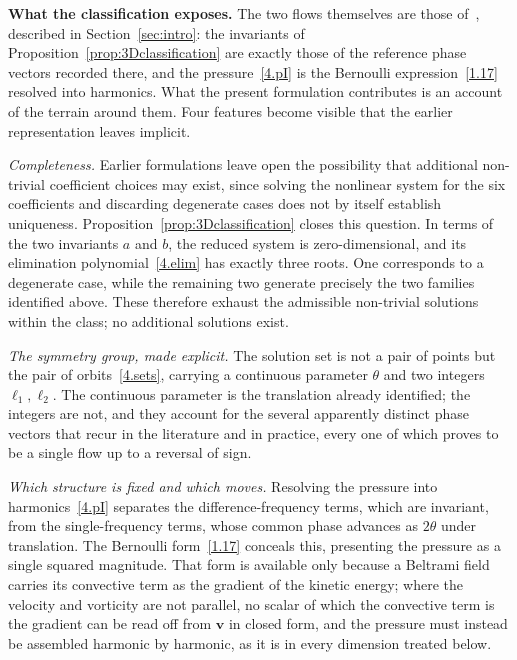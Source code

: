 \documentclass[11pt]{jfm}
\numberwithin{equation}{section}
\begin{document}
\medskip
\noindent\textbf{What the classification exposes.} The two flows themselves are those
of~\citet{ant}, described in Section~\ref{sec:intro}: the invariants of
Proposition~\ref{prop:3Dclassification} are exactly those of the reference phase vectors recorded
there, and the pressure~\eqref{4.pI} is the Bernoulli expression~\eqref{1.17} resolved into
harmonics. What the present formulation contributes is an account of the terrain around them.
Four features become visible that the earlier representation leaves implicit.

\emph{Completeness.} Earlier formulations leave open the possibility that additional non-trivial
coefficient choices may exist, since solving the nonlinear system for the six coefficients and
discarding degenerate cases does not by itself establish uniqueness.
Proposition~\ref{prop:3Dclassification} closes this question. In terms of the two invariants $a$
and $b$, the reduced system is zero-dimensional, and its elimination polynomial~\eqref{4.elim} has
exactly three roots. One corresponds to a degenerate case, while the remaining two generate
precisely the two families identified above. These therefore exhaust the admissible non-trivial
solutions within the class; no additional solutions exist.

\emph{The symmetry group, made explicit.} The solution set is not a pair of points but the pair of
orbits~\eqref{4.sets}, carrying a continuous parameter $\theta$ and two integers $\ell_1,\ell_2$.
The continuous parameter is the translation already identified; the integers are not, and they
account for the several apparently distinct phase vectors that recur in the literature and in
practice, every one of which proves to be a single flow up to a reversal of sign.

\emph{Which structure is fixed and which moves.} Resolving the pressure into
harmonics~\eqref{4.pI} separates the difference-frequency terms, which are invariant, from the
single-frequency terms, whose common phase advances as $2\theta$ under translation. The Bernoulli form~\eqref{1.17} conceals this, presenting the pressure as a single squared
magnitude. That form is available only because a Beltrami field carries its
convective term as the gradient of the kinetic energy; where the velocity and vorticity are not
parallel, no scalar of which the convective term is the gradient can be read off from
$\boldsymbol{v}$ in closed form, and the pressure must instead be assembled harmonic by harmonic,
as it is in every dimension treated below.
\end{document}
